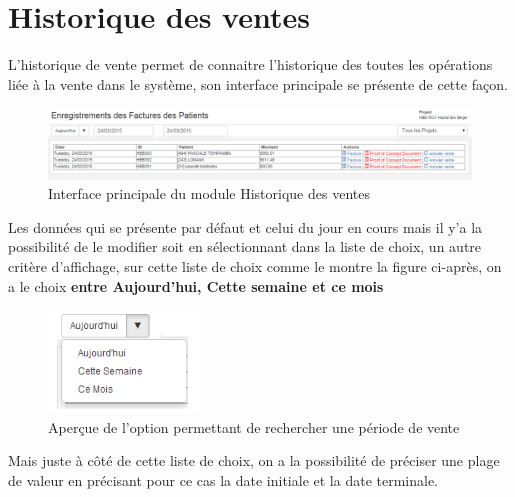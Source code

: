 \documentclass[12pt,a4paper]{report}
\begin{document}
\newpage

\section{Historique des ventes}
L'historique de vente permet de connaitre l'historique des toutes les opérations liée à la vente dans le système, son interface principale se présente de cette façon.


\begin{figure}[h]
\begin{center}
\includegraphics[width=14cm]{pic/HistoVente.png}
\end{center}
\caption{Interface principale du module Historique des ventes}
\label{Interface principale du module Historique des ventes}
\end{figure}

Les données qui se présente par défaut et celui du jour en cours mais il y'a la possibilité de le modifier soit en sélectionnant dans la liste de choix, un autre critère d'affichage, sur cette liste de choix comme le montre la figure ci-après, on a le choix \textbf{entre Aujourd'hui, Cette semaine et ce mois} 


\begin{figure}[h]
\begin{center}
\includegraphics[width=4cm]{pic/SelectJour.png}
\end{center}
\caption{Aperçue de l'option permettant de rechercher une période de vente}
\label{Aperçue de l'option permettant de rechercher une période de vente}
\end{figure}

Mais juste à côté de cette liste de choix, on a la possibilité de préciser une plage de valeur en précisant pour ce cas la date initiale et la date terminale.
\end{document}
